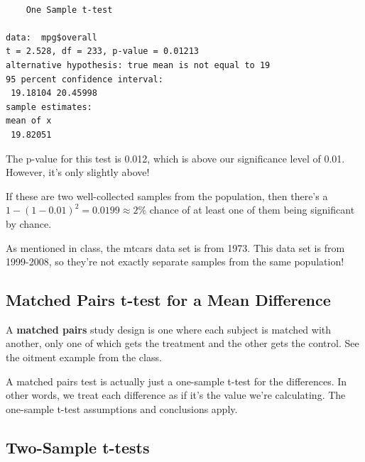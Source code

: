 \documentclass[
  letterpaper,
  DIV=11,
  numbers=noendperiod,
  oneside]{scrreprt}
\newenvironment{Shaded}{\begin{snugshade}}{\end{snugshade}}
\newcommand{\AttributeTok}[1]{\textcolor[rgb]{0.40,0.45,0.13}{#1}}
\newcommand{\DecValTok}[1]{\textcolor[rgb]{0.68,0.00,0.00}{#1}}
\newcommand{\FunctionTok}[1]{\textcolor[rgb]{0.28,0.35,0.67}{#1}}
\newcommand{\NormalTok}[1]{\textcolor[rgb]{0.00,0.23,0.31}{#1}}
\newcommand{\SpecialCharTok}[1]{\textcolor[rgb]{0.37,0.37,0.37}{#1}}
\begin{document}
\begin{Shaded}
\end{Shaded}

\begin{verbatim}

    One Sample t-test

data:  mpg$overall
t = 2.528, df = 233, p-value = 0.01213
alternative hypothesis: true mean is not equal to 19
95 percent confidence interval:
 19.18104 20.45998
sample estimates:
mean of x 
 19.82051 
\end{verbatim}

The p-value for this test is 0.012, which is above our significance
level of 0.01. However, it's only slightly above!

If these are two well-collected samples from the population, then
there's a \(1 - (1 - 0.01)^2 = 0.0199\approx 2\%\) chance of at least
one of them being significant by chance.

As mentioned in class, the mtcars data set is from 1973. This data set
is from 1999-2008, so they're not exactly separate samples from the same
population!

\hypertarget{matched-pairs-t-test-for-a-mean-difference}{%
\subsection{Matched Pairs t-test for a Mean
Difference}\label{matched-pairs-t-test-for-a-mean-difference}}

A \textbf{matched pairs} study design is one where each subject is
matched with another, only one of which gets the treatment and the other
gets the control. See the oitment example from the class.

A matched pairs test is actually just a one-sample t-test for the
differences. In other words, we treat each difference as if it's the
value we're calculating. The one-sample t-test assumptions and
conclusions apply.

\hypertarget{two-sample-t-tests-1}{%
\subsection{Two-Sample t-tests}\label{two-sample-t-tests-1}}
\end{document}
